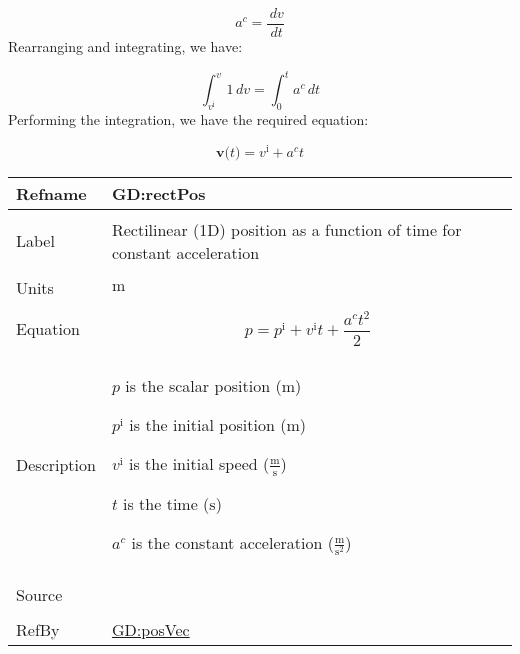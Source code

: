\documentclass[12pt]{article}
\begin{document}
\begin{displaymath}
{a^{c}}=\frac{\,dv}{\,dt}
\end{displaymath}
Rearranging and integrating, we have:

\begin{displaymath}
\int_{{v^{\text{i}}}}^{v}{1}\,dv=\int_{0}^{t}{{a^{c}}}\,dt
\end{displaymath}
Performing the integration, we have the required equation:

\begin{displaymath}
\mathbf{v}\text{(}t\text{)}={v^{\text{i}}}+{a^{c}} t
\end{displaymath}
\vspace{\baselineskip}
\noindent
\begin{minipage}{\textwidth}
\begin{tabular}{>{\raggedright}p{}>{\raggedright\arraybackslash}p{}}
\toprule \textbf{Refname} & \textbf{GD:rectPos}
\label{GD:rectPos}
\\ \midrule \\
Label & Rectilinear (1D) position as a function of time for constant acceleration
        
\\ \midrule \\
Units & ${\text{m}}$
        
\\ \midrule \\
Equation & \begin{displaymath}
           p={p^{\text{i}}}+{v^{\text{i}}} t+\frac{{a^{c}} t^{2}}{2}
           \end{displaymath}
\\ \midrule \\
Description & \begin{symbDescription}
              \item{$p$ is the scalar position (${\text{m}}$)}
              \item{${p^{\text{i}}}$ is the initial position (${\text{m}}$)}
              \item{${v^{\text{i}}}$ is the initial speed ($\frac{\text{m}}{\text{s}}$)}
              \item{$t$ is the time (${\text{s}}$)}
              \item{${a^{c}}$ is the constant acceleration ($\frac{\text{m}}{\text{s}^{2}}$)}
              \end{symbDescription}
\\ \midrule \\
Source & \cite[(pg. 8)]{hibbeler2004}
         
\\ \midrule \\
RefBy & \hyperref[GD:posVec]{GD:posVec}
        
\\ \bottomrule
\end{tabular}
\end{minipage}
\end{document}
